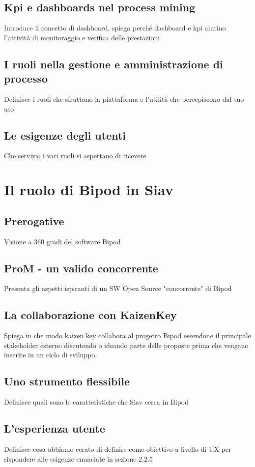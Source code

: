 \subsection{Kpi e dashboards nel process mining}
Introduce il concetto di dashboard, spiega perché dashboard e kpi aiutino l'attività di monitoraggio e verifica delle prestazioni 

\subsection{I ruoli nella gestione e amministrazione di processo}
Definisce i ruoli che sfruttano la piattaforma e l'utilità che percepiscono dal suo uso

\subsection{Le esigenze degli utenti}
Che servizio i vari ruoli si aspettano di ricevere
\section{Il ruolo di Bipod in Siav}
\subsection{Prerogative}
Visione a 360 gradi del software Bipod
\subsection{ProM - un valido concorrente}
Presenta gli aspetti ispiranti di un SW Open Source "concorrente" di Bipod
\subsection{La collaborazione con KaizenKey}
Spiega in che modo kaizen key collabora al progetto Bipod essendone il principale stakeholder esterno discutendo o ideando parte delle proposte prima che vengano inserite in un ciclo di sviluppo.
\subsection{Uno strumento flessibile}
Definisce quali sono le caratteristiche che Siav cerca in Bipod
\subsection{L'esperienza utente}
Definisce cosa abbiamo cerato di definire come obiettivo a livello di UX per rispondere alle esigenze enunciate in sezione 2.2.5